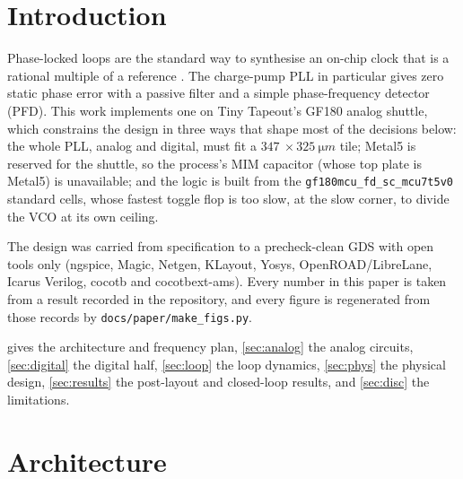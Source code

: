 \documentclass[10pt,twocolumn,letterpaper]{article}
\newcommand{\code}[1]{\texttt{\small #1}}
\begin{document}
\section{Introduction}
Phase-locked loops are the standard way to synthesise an on-chip clock that
is a rational multiple of a reference \cite{gardner,razavi}. The charge-pump
PLL in particular gives zero static phase error with a passive filter and a
simple phase-frequency detector (PFD). This work implements one on Tiny
Tapeout's GF180 analog shuttle, which constrains the design in three ways
that shape most of the decisions below: the whole PLL, analog and digital,
must fit a $\SI{347}{}\times\SI{325}{\micro m}$ tile; Metal5 is reserved for
the shuttle, so the process's MIM capacitor (whose top plate is Metal5) is
unavailable; and the logic is built from the
\code{gf180mcu\_fd\_sc\_mcu7t5v0} standard cells, whose fastest toggle flop
is too slow, at the slow corner, to divide the VCO at its own ceiling.

The design was carried from specification to a precheck-clean GDS with open
tools only (ngspice, Magic, Netgen, KLayout, Yosys, OpenROAD/LibreLane,
Icarus Verilog, cocotb and cocotbext-ams). Every number in this paper is
taken from a result recorded in the repository, and every figure is
regenerated from those records by \code{docs/paper/make\_figs.py}.

 gives the architecture and frequency plan,
\cref{sec:analog} the analog circuits, \cref{sec:digital} the digital half,
\cref{sec:loop} the loop dynamics, \cref{sec:phys} the physical design,
\cref{sec:results} the post-layout and closed-loop results, and
\cref{sec:disc} the limitations.

\section{Architecture}\label{sec:arch}
\end{document}
